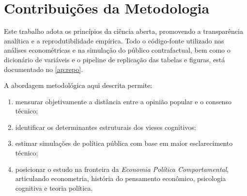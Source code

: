 
\section{Contribuições da Metodologia}

Este trabalho adota os princípios da ciência aberta, promovendo a transparência analítica e a reprodutibilidade empírica. Todo o código-fonte utilizado nas análises econométricas e na simulação do público contrafactual, bem como o dicionário de variáveis e o pipeline de replicação das tabelas e figuras, está documentado no \autoref{ap:repo}.

A abordagem metodológica aqui descrita permite:
\begin{enumerate}[label=\alph*)]
    \item mensurar objetivamente a distância entre a opinião popular e o consenso técnico;
    \item identificar os determinantes estruturais dos vieses cognitivos;
    \item estimar simulações de política pública com base em maior esclarecimento técnico;
    \item posicionar o estudo na fronteira da \textit{Economia Política Comportamental}, articulando econometria, história do pensamento econômico, psicologia cognitiva e teoria política.
\end{enumerate}
